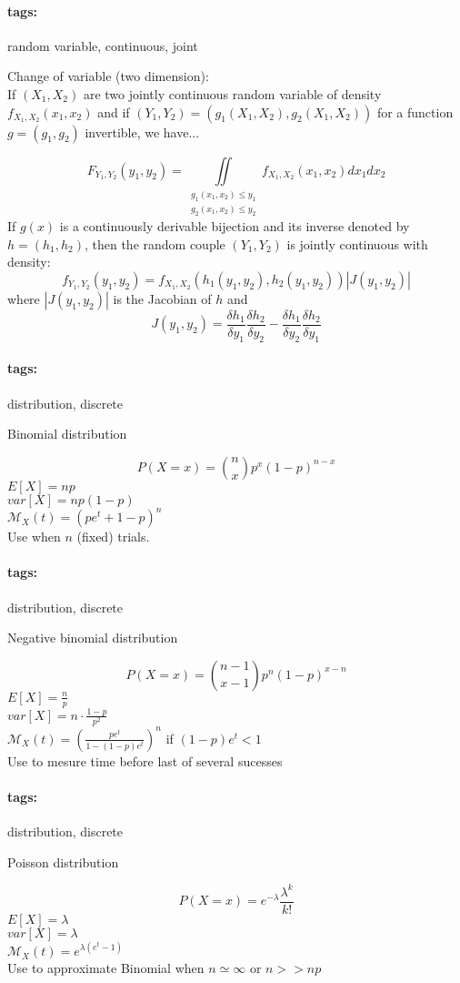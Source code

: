 \documentclass[12pt]{article}
\newcommand*{\xfield}[1]{\begin{mdframed}\centering #1\end{mdframed}\bigskip}
\newenvironment{note}{}{}
\newcommand*{\tags}[1]{\paragraph{tags: }#1}
\begin{document}
\begin{note}
	\tags{random variable, continuous, joint}
	\xfield{Change of variable (two dimension):\\
If $(X_1,X_2)$ are two jointly continuous random variable of density $f_{X_1,X_2}(x_1,x_2)$ and if
    $(Y_1,Y_2)=(g_1(X_1,X_2),g_2(X_1,X_2))$ for a function $g=(g_1,g_2)$ invertible, we have...} %
	\xfield{$$F_{Y_1,Y_2}(y_1,y_2) = \iint\limits_{\substack{g_1(x_1,x_2)\le y_1
        \\ g_2(x_1,x_2) \le y_2}} f_{X_1,X_2}(x_1,x_2)dx_1 dx_2$$
If $g(x)$ is a continuously derivable bijection and its inverse denoted by
$h=(h_1,h_2)$, then the random couple $(Y_1,Y_2)$ is jointly continuous with
density:
$$f_{Y_1,Y_2}(y_1,y_2) = f_{X_1,X_2}(h_1(y_1,y_2),h_2(y_1,y_2)) | J(y_1,y_2) |$$
where $|J(y_1,y_2)|$ is the Jacobian of $h$ and
$$J(y_1,y_2) = \frac{\delta h_1}{\delta y_1}\frac{\delta h_2}{\delta y_2} -
\frac{\delta h_1}{\delta y_2} \frac{\delta h_2}{\delta y_1}$$
} %
\end{note}

\begin{note}
\tags{distribution, discrete}
\xfield{Binomial distribution}
\xfield{$$P(X = x) = \binom{n}{x} p^x (1-p)^{n-x}$$
$E[X] = np$\\
$var[X] = np(1-p)$\\
$\mathcal{M}_X(t) = (pe^t+1-p)^n$\\
Use when $n$ (fixed) trials.
}
\end{note}

\begin{note}
\tags{distribution, discrete}
\xfield{Negative binomial distribution}
\xfield{$$P(X = x) = \binom{n-1}{x-1}p^n(1-p)^{x-n}$$
$E[X] = \frac{n}{p}$\\
$var[X] = n \cdot \frac{1-p}{p^2}$\\
$\mathcal{M}_X(t) = \left(  \frac{pe^t}{1-(1-p)e^t}\right)^n$ if $(1-p)e^t < 1$\\
Use to mesure time before last of several sucesses}
\end{note}

\begin{note}
\tags{distribution, discrete}
\xfield{Poisson distribution}
\xfield{$$P(X = x) = e^{-\lambda}\frac{\lambda^k}{k!}$$
$E[X] = \lambda$\\
$var[X] = \lambda$\\
$\mathcal{M}_X(t) = e^{\lambda(e^t-1)}$\\
Use to approximate Binomial when $n\simeq \infty$ or $n >> np$}
\end{note}
\end{document}
